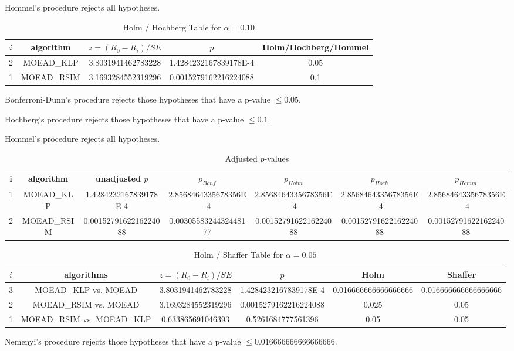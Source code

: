 \documentclass[a4paper,10pt]{article}
\begin{document}
\begin{landscape}
Hommel's procedure rejects all hypotheses.


\begin{table}[!htp]
\centering\tiny
\caption{Holm / Hochberg Table for $\alpha=0.10$}
\begin{tabular}{ccccc}
$i$&algorithm&$z=(R_0 - R_i)/SE$&$p$&Holm/Hochberg/Hommel\\
\hline
2&MOEAD_KLP&3.8031941462783228&1.4284232167839178E-4&0.05\\
1&MOEAD_RSIM&3.1693284552319296&0.0015279162216224088&0.1\\
\hline
\end{tabular}
\end{table}
Bonferroni-Dunn's procedure rejects those hypotheses that have a p-value $\le0.05$.


Hochberg's procedure rejects those hypotheses that have a p-value $\le0.1$.


Hommel's procedure rejects all hypotheses.


\begin{table}[!htp]
\centering\tiny
\caption{Adjusted $p$-values}
\begin{tabular}{ccccccc}
i&algorithm&unadjusted $p$&$p_{Bonf}$&$p_{Holm}$&$p_{Hoch}$&$p_{Homm}$\\
\hline
1&MOEAD_KLP&1.4284232167839178E-4&2.8568464335678356E-4&2.8568464335678356E-4&2.8568464335678356E-4&2.8568464335678356E-4\\
2&MOEAD_RSIM&0.0015279162216224088&0.0030558324432448177&0.0015279162216224088&0.0015279162216224088&0.0015279162216224088\\
\hline
\end{tabular}
\end{table}

\begin{table}[!htp]
\centering\tiny
\caption{Holm / Shaffer Table for $\alpha=0.05$}
\begin{tabular}{cccccc}
$i$&algorithms&$z=(R_0 - R_i)/SE$&$p$&Holm&Shaffer\\
\hline
3&MOEAD_KLP vs. MOEAD&3.8031941462783228&1.4284232167839178E-4&0.016666666666666666&0.016666666666666666\\
2&MOEAD_RSIM vs. MOEAD&3.1693284552319296&0.0015279162216224088&0.025&0.05\\
1&MOEAD_RSIM vs. MOEAD_KLP&0.633865691046393&0.5261684777561396&0.05&0.05\\
\hline
\end{tabular}
\end{table}
Nemenyi's procedure rejects those hypotheses that have a p-value $\le0.016666666666666666$.



\end{landscape}
\end{document}
